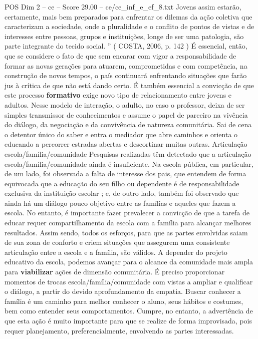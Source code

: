 \begin{textsample}{POS Dim 2 – ce – Score 29.00 – ce/ce\_inf\_e\_ef\_8.txt}
Jovens assim estarão, certamente, mais bem preparados para enfrentar os dilemas da ação coletiva que caracterizam a sociedade, onde a pluralidade e o conflito de pontos de vistas e de interesses entre pessoas, grupos e instituições, longe de ser uma patologia, são parte integrante do tecido social. ” ( COSTA, 2006, p. 142 ) É essencial, então, que se considere o fato de que sem encarar com vigor a responsabilidade de formar as novas gerações para atuarem, comprometidas e com competência, na construção de novos tempos, o país continuará enfrentando situações que farão jus à crítica de que não está dando certo.
É também essencial a convicção de que este processo \textbf{formativo} exige novo tipo de relacionamento entre jovens e adultos.
Nesse modelo de interação, o adulto, no caso o professor, deixa de ser simples transmissor de conhecimentos e assume o papel de parceiro na vivência do diálogo, da negociação e da convivência de natureza comunitária.
Sai de cena o detentor único do saber e entra o mediador que abre caminhos e orienta o educando a percorrer estradas abertas e descortinar muitas outras.
Articulação escola/família/comunidade Pesquisas realizadas têm detectado que a articulação escola/família/comunidade ainda é insuficiente.
Na escola pública, em particular, de um lado, foi observada a falta de interesse dos pais, que entendem de forma equivocada que a educação do seu filho ou dependente é de responsabilidade exclusiva da instituição escolar ; e, de outro lado, também foi observado que ainda há um diálogo pouco objetivo entre as famílias e aqueles que fazem a escola.
No entanto, é importante fazer prevalecer a convicção de que a tarefa de educar requer compartilhamento da escola com a família para alcançar melhores resultados.
Assim sendo, todos os esforços, para que as partes envolvidas saiam de sua zona de conforto e criem situações que assegurem uma consistente articulação entre a escola e a família, são válidos.
A depender do projeto educativo da escola, podemos avançar para o alcance da comunidade mais ampla para \textbf{viabilizar} ações de dimensão comunitária.
É preciso proporcionar momentos de trocas escola/família/comunidade com vistas a ampliar e qualificar o diálogo, a partir do devido aprofundamento da empatia.
Buscar conhecer a família é um caminho para melhor conhecer o aluno, seus hábitos e costumes, bem como entender seus comportamentos.
Cumpre, no entanto, a advertência de que esta ação é muito importante para que se realize de forma improvisada, pois requer planejamento, preferencialmente, envolvendo as partes interessadas.

\end{textsample}
